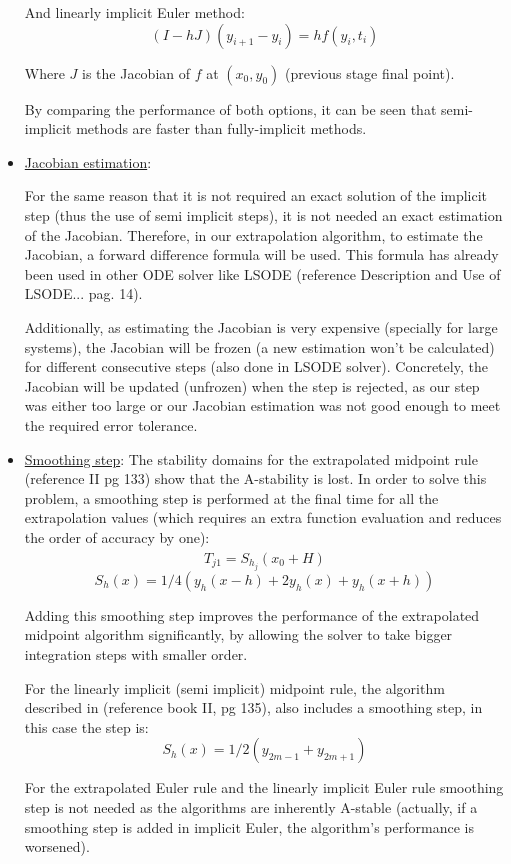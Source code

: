 \documentclass[12pt]{article}
\begin{document}
\begin{itemize}
And linearly implicit Euler method:
    	$$(I-hJ)(y_{i+1}-y_{i})=hf(y_{i},t_{i})$$
   
Where $J$ is the Jacobian of $f$ at $(x_{0},y_{0})$ (previous stage final point).

By comparing the performance of both options, it can be seen that  semi-implicit methods are faster than fully-implicit methods.

	\item \underline{Jacobian estimation}:

For the same reason that it is not required an exact solution of the implicit step (thus the use of semi implicit steps), it is not needed an exact estimation of the Jacobian.
Therefore, in our extrapolation algorithm, to estimate the Jacobian, a forward difference formula will be used. This formula has already been used in other ODE solver like LSODE (reference Description and Use of LSODE... pag. 14).

Additionally, as estimating the Jacobian is very expensive (specially for large systems), the Jacobian will be frozen (a new estimation won't be calculated) for different consecutive steps (also done in LSODE solver). Concretely, the Jacobian will be updated (unfrozen) when the step is rejected, as our step was either too large or our Jacobian estimation was not good enough to meet the required error tolerance.

	\item \underline{Smoothing step}:
	The stability domains for the extrapolated midpoint rule (reference II pg 133) show that the A-stability is lost. In order to solve this problem, a smoothing step is performed at the final time for all the extrapolation values (which requires an extra function evaluation
and reduces the order of accuracy by one): 
    $$\hat{T}_{j1} = S_{h_{j}}(x_{0}+H)$$
    $$S_{h}(x) = 1/4(y_{h}(x-h)+2y_{h}(x)+y_{h}(x+h))$$ 
    
Adding this smoothing step improves the performance of the extrapolated midpoint algorithm significantly, by allowing the solver to take bigger integration steps with smaller order. 

For the linearly implicit (semi implicit) midpoint rule, the algorithm described in (reference book II, pg 135), also includes a smoothing step, in this case the step is:
$$S_{h}(x)=1/2(y_{2m-1}+y_{2m+1})$$

For the extrapolated Euler rule and the linearly implicit Euler rule smoothing step is not needed as the algorithms are inherently A-stable (actually, if a smoothing step is added in implicit Euler, the algorithm's performance is worsened).



\end{itemize}
\end{document}
